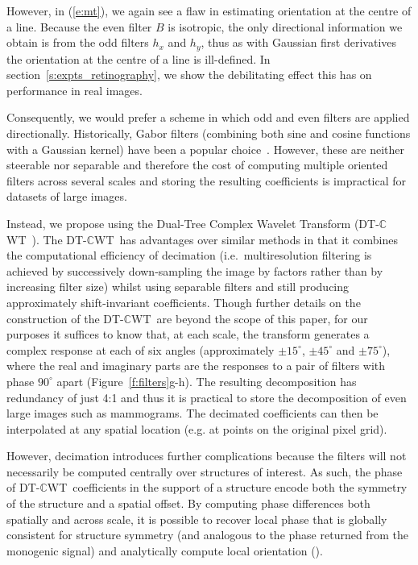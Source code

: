 \documentclass[runningheads,a4paper]{llncs}
\newcommand{\fref}[1]{Figure~\ref{#1}}
\newcommand{\eref}[1]{(\ref{#1})}
\def\dtcwt{DT-$\mathbb{C}$WT}
\def\ie{i.e.}
\newcommand{\comment}[1]{}
\begin{document}
However, in \eref{e:mt}, we again see a flaw in estimating orientation at the centre of a line. Because the even filter $B$ is isotropic, the only directional information we obtain is from the odd filters $h_x$ and $h_y$, thus as with Gaussian first derivatives the orientation at the centre of a line is ill-defined. In section~\ref{s:expts_retinography}, we show the debilitating effect this has on performance in real images.

Consequently, we would prefer a scheme in which odd and even filters are applied directionally. Historically, Gabor filters (combining both sine and cosine functions with a Gaussian kernel) have been a popular choice~\cite{Daugman_TASSP88}. However, these are neither steerable nor separable and therefore the cost of computing multiple oriented filters across several scales and storing the resulting coefficients is impractical for datasets of large images.

\comment{We leave Gabor filters, not only because they are computationally intensive but also because of the extra free parameter (angular resolution) that will affect the accuracy of the estimated orientation}

Instead, we propose using the Dual-Tree Complex Wavelet Transform (\dtcwt~\cite{Kingsbury_PTRSLA99}). The \dtcwt~has advantages over similar methods in that it combines the computational efficiency of decimation (\ie~multiresolution filtering is achieved by successively down-sampling the image by factors rather than by increasing filter size) whilst using separable filters and still producing approximately shift-invariant coefficients. Though further details on the construction of the \dtcwt~are beyond the scope of this paper, for our purposes it suffices to know that, at each scale, the transform generates a complex response at each of six angles (approximately $\pm15^\circ$, $\pm45^\circ$ and $\pm75^\circ$), where the real and imaginary parts are the responses to a pair of filters with phase $90^\circ$ apart (\fref{f:filters}g-h). The resulting decomposition has redundancy of just 4:1 and thus it is practical to store the decomposition of even large images such as mammograms. The decimated coefficients can then be interpolated at any spatial location (e.g. at points on the original pixel grid).

However, decimation introduces further complications because the filters will not necessarily be computed centrally over structures of interest. As such, the phase of \dtcwt~coefficients in the support of a structure encode both the symmetry of the structure and a spatial offset. By computing phase differences both spatially and across scale, it is possible to recover local phase that is globally consistent for structure symmetry (and analogous to the phase returned from the monogenic signal) and analytically compute local orientation (\cite{Anderson_ICP05,Anderson_ILP05}).
\end{document}
